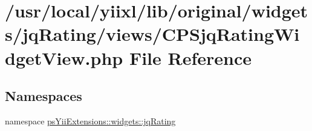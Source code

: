 \hypertarget{CPSjqRatingWidgetView_8php}{
\section{/usr/local/yiixl/lib/original/widgets/jqRating/views/CPSjqRatingWidgetView.php File Reference}
\label{CPSjqRatingWidgetView_8php}
}
\subsection*{Namespaces}
\begin{DoxyCompactItemize}
\item 
namespace \hyperlink{namespacepsYiiExtensions_1_1widgets_1_1jqRating}{psYiiExtensions::widgets::jqRating}
\end{DoxyCompactItemize}
